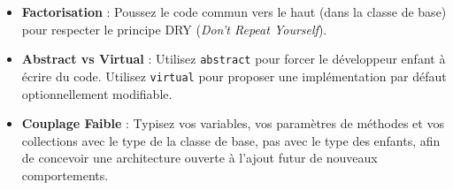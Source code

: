 \begin{itemize}
    \item \textbf{Factorisation} : Poussez le code commun vers le haut (dans la classe de base) pour respecter le principe DRY (\textit{Don't Repeat Yourself}).
    \item \textbf{Abstract vs Virtual} : Utilisez \texttt{abstract} pour forcer le développeur enfant à écrire du code. Utilisez \texttt{virtual} pour proposer une implémentation par défaut optionnellement modifiable.
    \item \textbf{Couplage Faible} : Typisez vos variables, vos paramètres de méthodes et vos collections avec le type de la classe de base, pas avec le type des enfants, afin de concevoir une architecture ouverte à l'ajout futur de nouveaux comportements.
\end{itemize}
